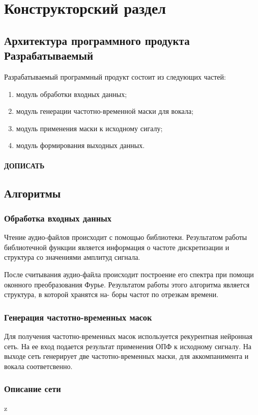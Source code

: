 \chapter{Конструкторский раздел}
\label{cha:design}

\section{Архитектура программного продукта Разрабатываемый}

Разрабатываемый программный продукт состоит из следующих частей:

\begin{enumerate}
	\item модуль обработки входных данных;
	\item модуль генерации частотно-временной маски для вокала;
	\item модуль применения маски к исходному сигалу;
	\item модуль формирования выходных данных.
\end{enumerate}


\subsubsection{ДОПИСАТЬ}

\section{Алгоритмы}

\subsection{Обработка входных данных}

Чтение аудио-файлов происходит с помощью библиотеки. Результатом работы библиотечной функции является информация о частоте дискретизации и структура со значениями амплитуд сигнала. 

После считывания аудио-файла происходит построение его спектра при помощи оконного преобразования Фурье. Результатом работы этого алгоритма является структура, в которой хранятся на- боры частот по отрезкам времени.

\subsection{Генерация частотно-временных масок}

Для получения частотно-временных масок используется рекурентная нейронная сеть. На ее вход подается результат применения ОПФ к исходному сигналу. На выходе сеть генерирует две частотно-временных маски, для аккомпанимента и вокала соответсвенно.

\subsection{Описание сети}

z
